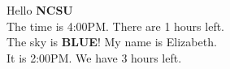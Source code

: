 \documentclass[11pt]{article}
\begin{document}
Hello \textbf{NCSU}
\\The time is 4:00PM.  There are 1 hours left.
\\The sky is \textbf{BLUE}!
My name is Elizabeth.
\\It is 2:00PM.  We have 3 hours left.
\end{document}

